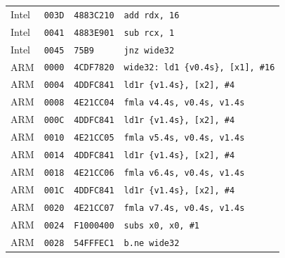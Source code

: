 \begin{table}[htbp]
\begin{tabular}{@{}l|l|l|p{7.2cm}@{}}
Intel & \texttt{003D} & \texttt{4883C210} & \texttt{add rdx, 16} \\
Intel & \texttt{0041} & \texttt{4883E901} & \texttt{sub rcx, 1} \\
Intel & \texttt{0045} & \texttt{75B9} & \texttt{jnz wide32} \\
\midrule
ARM & \texttt{0000} & \texttt{4CDF7820} & \texttt{wide32: ld1 \{v0.4s\}, [x1], \#16} \\
ARM & \texttt{0004} & \texttt{4DDFC841} & \texttt{ld1r \{v1.4s\}, [x2], \#4} \\
ARM & \texttt{0008} & \texttt{4E21CC04} & \texttt{fmla v4.4s, v0.4s, v1.4s} \\
ARM & \texttt{000C} & \texttt{4DDFC841} & \texttt{ld1r \{v1.4s\}, [x2], \#4} \\
ARM & \texttt{0010} & \texttt{4E21CC05} & \texttt{fmla v5.4s, v0.4s, v1.4s} \\
ARM & \texttt{0014} & \texttt{4DDFC841} & \texttt{ld1r \{v1.4s\}, [x2], \#4} \\
ARM & \texttt{0018} & \texttt{4E21CC06} & \texttt{fmla v6.4s, v0.4s, v1.4s} \\
ARM & \texttt{001C} & \texttt{4DDFC841} & \texttt{ld1r \{v1.4s\}, [x2], \#4} \\
ARM & \texttt{0020} & \texttt{4E21CC07} & \texttt{fmla v7.4s, v0.4s, v1.4s} \\
ARM & \texttt{0024} & \texttt{F1000400} & \texttt{subs x0, x0, \#1} \\
ARM & \texttt{0028} & \texttt{54FFFEC1} & \texttt{b.ne wide32} \\
\bottomrule
\end{tabular}
\endgroup
\end{table}
\noindent{}\par
